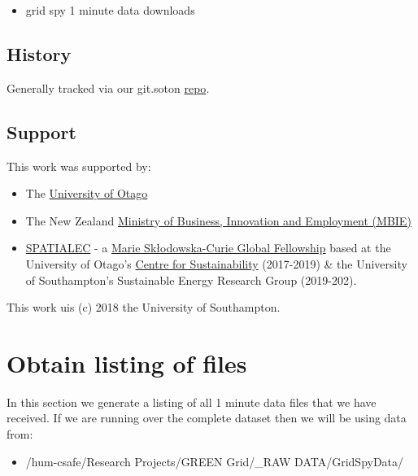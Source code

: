 \documentclass[]{article}
\providecommand{\tightlist}{%
  \setlength{\itemsep}{0pt}\setlength{\parskip}{0pt}}
\begin{document}
\begin{itemize}
\tightlist
\item
  grid spy 1 minute data downloads
\end{itemize}

\subsection{History}\label{history}

Generally tracked via our git.soton
\href{https://git.soton.ac.uk/ba1e12/nzGREENGrid}{repo}.

\subsection{Support}\label{support}

This work was supported by:

\begin{itemize}
\tightlist
\item
  The \href{https://www.otago.ac.nz/}{University of Otago}
\item
  The New Zealand \href{http://www.mbie.govt.nz/}{Ministry of Business,
  Innovation and Employment (MBIE)}
\item
  \href{http://www.energy.soton.ac.uk/tag/spatialec/}{SPATIALEC} - a
  \href{http://ec.europa.eu/research/mariecurieactions/about-msca/actions/if/index_en.htm}{Marie
  Skłodowska-Curie Global Fellowship} based at the University of Otago's
  \href{http://www.otago.ac.nz/centre-sustainability/staff/otago673896.html}{Centre
  for Sustainability} (2017-2019) \& the University of Southampton's
  Sustainable Energy Research Group (2019-202).
\end{itemize}

This work uis (c) 2018 the University of Southampton.

\section{Obtain listing of files}\label{obtain-listing-of-files}

In this section we generate a listing of all 1 minute data files that we
have received. If we are running over the complete dataset then we will
be using data from:

\begin{itemize}
\tightlist
\item
  /hum-csafe/Research Projects/GREEN Grid/\_RAW DATA/GridSpyData/
\end{itemize}
\end{document}
